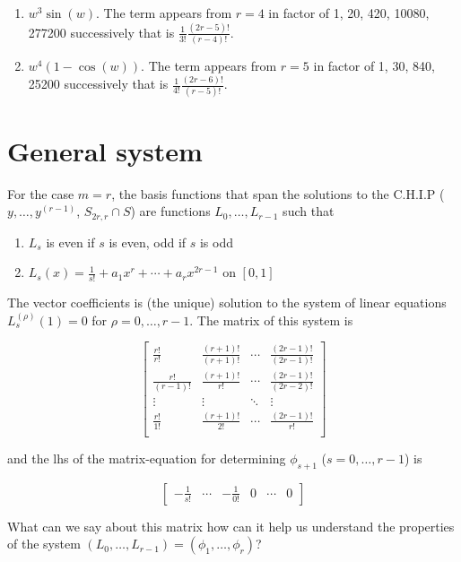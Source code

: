 \documentclass[a4paper, 11pt]{article}
\begin{document}
\begin{itemize}
\begin{enumerate}
      \item $w^3 \sin (w)$.
        The term appears from $r=4$ in factor of 1, 20, 420, 10080, 277200 successively that is 
        $\frac{1}{3!}\frac{(2r-5)!}{(r-4)!}$.
      
      \item $w^4 (1-\cos (w))$.
        The term appears from $r=5$ in factor of 1, 30, 840, 25200 successively that is 
        $\frac{1}{4!}\frac{(2r-6)!}{(r-5)!}$.
    
    \end{enumerate}

\end{itemize}

\section{General system}

For the case $m=r$, the basis functions that span the solutions to the C.H.I.P ($y, \dots, y^{(r-1)}$, $S_{2r,r} \cap 
S$) are functions $L_0, \dots, L_{r-1}$ such that

\begin{enumerate}
  \item $L_s$ is even if $s$ is even, odd if $s$ is odd
  \item $L_s(x) = \frac{1}{s!} + a_1x^r + \cdots + a_r x^{2r-1}$ on $[0,1]$
\end{enumerate}

The vector coefficients  is (the unique) solution to the system of linear equations $L_s^{(\rho)}(1) = 0$ for $\rho = 0, 
\dots, r-1$. The matrix of this system is

\begin{equation}
  \begin{bmatrix}
    \frac{r!}{r!} & \frac{(r+1)!}{(r+1)!} & \cdots & \frac{(2r-1)!}{(2r-1)!}  \\
    \frac{r!}{(r-1)!} & \frac{(r+1)!}{r!} & \cdots & \frac{(2r-1)!}{(2r-2)!}  \\
    \vdots & \vdots & \ddots & \vdots \\
    \frac{r!}{1!} & \frac{(r+1)!}{2!} & \cdots & \frac{(2r-1)!}{r!}  \\
  \end{bmatrix}
\end{equation}

and the lhs of the matrix-equation for determining $\phi_{s+1}$ ($s=0, \ldots, r-1$) is 

\begin{equation*}
  \begin{bmatrix} -\frac{1}{s!} & \cdots & -\frac{1}{0!} & 0 & \cdots & 0 \end{bmatrix}
\end{equation*}

What can we say about this matrix how can it help us understand the properties of the system $(L_0, \dots, L_{r-1}) = 
(\phi_1, \dots, \phi_r)$?
\end{document}

